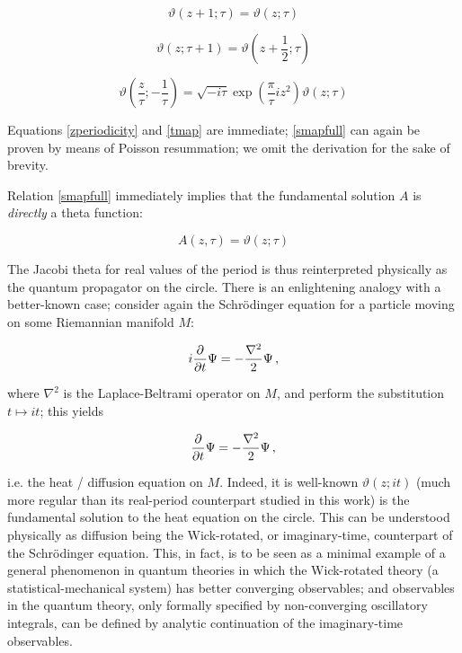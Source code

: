 \documentclass{article}
\newcommand{\T}{\ensuremath{\vartheta}}
\begin{document}
\begin{equation} \label{zperiodicity}
    \vartheta(z+1;\tau) = \vartheta(z;\tau)
\end{equation}

\begin{equation} \label{tmap}
    \vartheta(z;\tau + 1) = \vartheta(z+\frac{1}{2}; \tau)
\end{equation}

\begin{equation}\label{smapfull}
    \vartheta\left(\frac{z}{\tau}; -\frac{1}{\tau} \right) = \sqrt{-i\tau} \exp(\frac{\pi}{\tau} i z^2) \T(z;\tau)
\end{equation}

Equations \eqref{zperiodicity} and \eqref{tmap} are immediate; \eqref{smapfull} can again be proven by means of Poisson resummation\cite{thetamodular}; we omit the derivation for the sake of brevity.

Relation \eqref{smapfull} immediately implies that the fundamental solution $A$ is \emph{directly} a theta function:

\begin{equation}
    A(z,\tau) = \vartheta(z;\tau)
\end{equation}

The Jacobi theta for real values of the period is thus reinterpreted physically as the quantum propagator on the circle. There is an enlightening analogy with a better-known case; consider again the Schr\"odinger equation for a particle moving on some Riemannian manifold $M$:

\begin{equation}
    i \pdv{t} \Psi = - \frac{\nabla^2}{2} \Psi\,,
\end{equation}

where $\nabla^2$ is the Laplace-Beltrami operator on $M$, and perform the substitution $t \mapsto it$; this yields

\begin{equation}
    \pdv{t} \Psi = - \frac{\nabla^2}{2} \Psi\,,
\end{equation}

i.e. the heat / diffusion equation on $M$. Indeed, it is well-known $\vartheta(z;it)$ (much more regular than its real-period counterpart studied in this work) is the fundamental solution to the heat equation on the circle. This can be understood physically as diffusion being the Wick-rotated, or imaginary-time, counterpart of the Schr\"odinger equation. This, in fact, is to be seen as a minimal example of a general phenomenon in quantum theories in which the Wick-rotated theory (a statistical-mechanical system) has better converging observables; and observables in the quantum theory, only formally specified by non-converging oscillatory integrals, can be defined by analytic continuation of the imaginary-time observables.
\end{document}
